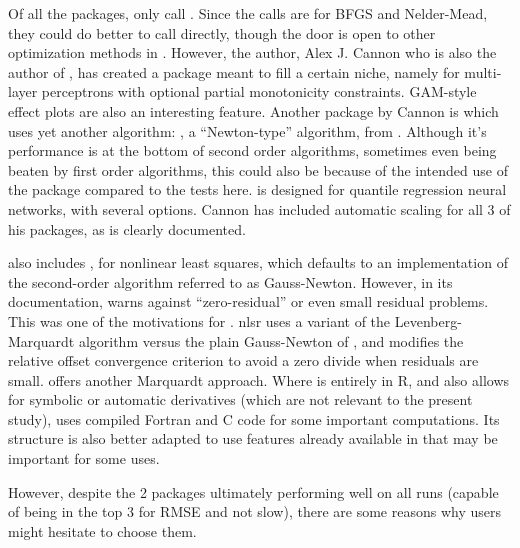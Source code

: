 Of all the packages, only  \citep{R-monmlp} call
. Since the calls are for BFGS and Nelder-Mead, they
could do better to call  directly, though the door is open
to other optimization methods in . However, the author,
Alex J. Cannon who is also the author of , has created
a package meant to fill a certain niche, namely for multi-layer
perceptrons with optional partial monotonicity constraints. GAM-style
effect plots are also an interesting feature. Another package by Cannon
is  \citep{R-qrnn} which uses yet another algorithm:
, a ``Newton-type'' algorithm, from . Although
it's performance is at the bottom of second order algorithms, sometimes
even being beaten by first order algorithms, this could also be because
of the intended use of the package compared to the tests here.
 is designed for quantile regression neural networks, with
several options. Cannon has included automatic scaling for all 3 of his
packages, as is clearly documented.

 also includes , for nonlinear least squares, which
defaults to an implementation of the second-order algorithm referred to
as Gauss-Newton. However, in its documentation,  warns against
``zero-residual'' or even small residual problems. \citep[Section
6.4.1]{Nash-nlpor14} This was one of the motivations for 
\citep{R-nlsr}. nlsr uses a variant \citep{jn77ima} of the
Levenberg-Marquardt algorithm versus the plain Gauss-Newton of
, and modifies the relative offset convergence criterion to
avoid a zero divide when residuals are small. 
\citep{minpack.lm} offers another Marquardt approach. Where
 is entirely in \textsf{R}, and also allows for symbolic
or automatic derivatives (which are not relevant to the present study),
 uses compiled Fortran and \textsf{C} code for some
important computations. Its structure is also better adapted to use
features already available in  that may be important for some
uses.

However, despite the 2 packages ultimately performing well on all runs
(capable of being in the top 3 for RMSE and not slow), there are some
reasons why users might hesitate to choose them.

